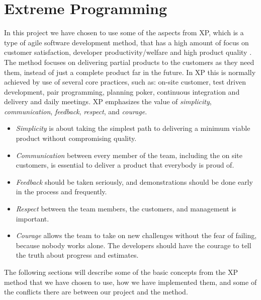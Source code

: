 
\section{Extreme Programming}
\label{sec:extreme_programming}

In this project we have chosen to use some of the aspects from XP, which is a type of agile software development method, that has a high amount of focus on customer satisfaction, developer productivity/welfare and high product quality \parencite{xp}. The method focuses on delivering partial products to the customers as they need them, instead of just a complete product far in the future. In XP this is normally achieved by use of several core practices, such as: on-site customer, test driven development, pair programming, planning poker, continuous integration and delivery and daily meetings. XP emphasizes the value of \emph{simplicity}, \emph{communication}, \emph{feedback}, \emph{respect}, and \emph{courage}. 

\begin{itemize}
    \setlength\itemsep{-0.2em}
	\item \emph{Simplicity} is about taking the simplest path to delivering a minimum viable product without compromising quality. 
	\item \emph{Communication} between every member of the team, including the on site customers, is essential to deliver a product that everybody is proud of. 
	\item \emph{Feedback} should be taken seriously, and demonstrations should be done early in the process and frequently.
	\item \emph{Respect} between the team members, the customers, and management is important.
	\item \emph{Courage} allows the team to take on new challenges without the fear of failing, because nobody works alone. The developers should have the courage to tell the truth about progress and estimates. 
\end{itemize}

The following sections will describe some of the basic concepts from the XP method that we have chosen to use, how we have implemented them, and some of the conflicts there are between our project and the method.

